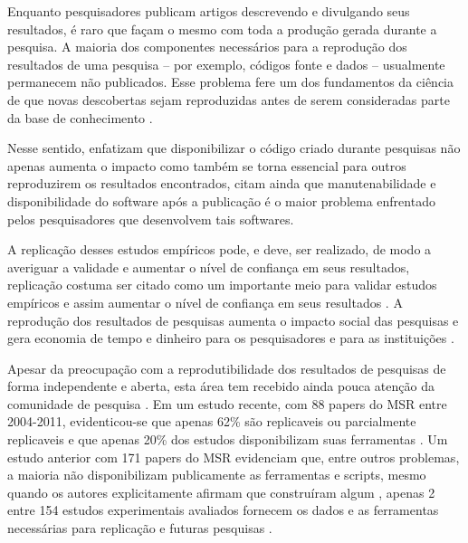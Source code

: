 Enquanto pesquisadores publicam artigos descrevendo e divulgando seus
resultados, é raro que façam o mesmo com toda a produção gerada durante a
pesquisa. A maioria dos componentes necessários para a reprodução dos
resultados de uma pesquisa -- por exemplo, códigos fonte e dados -- usualmente
permanecem não publicados. Esse problema fere um dos fundamentos
da ciência de que novas descobertas sejam reproduzidas antes de serem
consideradas parte da base de conhecimento \cite{Stodden2009}.

%
%


Nesse sentido,  enfatizam que disponibilizar o código
criado durante pesquisas não apenas aumenta o impacto como também se torna
essencial para outros reproduzirem os resultados encontrados, citam ainda que
manutenabilidade e disponibilidade do software após a publicação é o maior
problema enfrentado pelos pesquisadores que desenvolvem tais softwares.

A replicação desses estudos empíricos pode, e deve, ser realizado, de modo a
averiguar a validade e aumentar o nível de confiança em seus resultados,
replicação costuma ser citado como um importante meio para validar estudos
empíricos e assim aumentar o nível de confiança em seus resultados
\cite{Almqvist2006}. A reprodução dos resultados de pesquisas aumenta o impacto
social das pesquisas e gera economia de tempo e dinheiro para os pesquisadores
e para as instituições \cite{Nesta2010}.

Apesar da preocupação com a reprodutibilidade dos resultados de pesquisas de
forma independente \cite{Stodden2009} e aberta, esta área tem recebido ainda
pouca atenção da comunidade de pesquisa \cite{Nancy2015, Grand2010Open}. Em um
estudo recente, com 88 papers do MSR entre 2004-2011, evidenticou-se que apenas
62\% são replicaveis ou parcialmente replicaveis e que apenas 20\% dos estudos
disponibilizam suas ferramentas \cite{amann2015software}. Um estudo anterior
com 171 papers do MSR evidenciam que, entre outros problemas, a maioria não
disponibilizam publicamente as ferramentas e scripts, mesmo quando os autores
explicitamente afirmam que construíram algum \cite{robles2010replicating},
apenas 2 entre 154 estudos experimentais avaliados fornecem os dados e as
ferramentas necessárias para replicação e futuras pesquisas
\cite{barr2010shoulders}.


